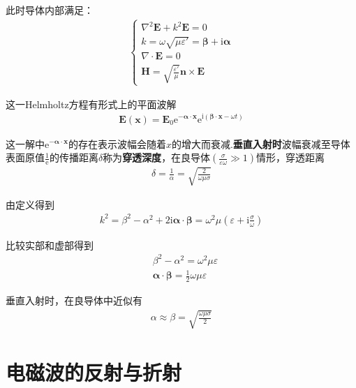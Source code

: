 \documentclass[main.tex]{subfiles}
\begin{document}
此时导体内部满足：
\begin{align}
    \left\{\begin{array}{l}
        \nabla ^2\boldsymbol{E}+k^2 \boldsymbol{E} = 0\\
        k = \omega \sqrt{\mu \varepsilon '} = \boldsymbol{\beta} + \mathrm{i} \boldsymbol{\alpha}\\
        \nabla \cdot \boldsymbol{E} = 0\\
        \boldsymbol{H} = \displaystyle \sqrt{\frac{\varepsilon '}{\mu}}\boldsymbol{n}\times \boldsymbol{E}
    \end{array}\right.
\end{align}

这一Helmholtz方程有形式上的平面波解
\begin{align}
    \boldsymbol{E}(\boldsymbol{x}) = \boldsymbol{E}_0 \mathrm{e}^{-\boldsymbol{\alpha} \cdot \boldsymbol{x}} \mathrm{e}^{\mathrm{i}(\boldsymbol{\beta} \cdot \boldsymbol{x}-\omega t)}
\end{align}

这一解中$\mathrm{e}^{-\boldsymbol{\alpha} \cdot \boldsymbol{x}}$的存在表示波幅会随着$x$的增大而衰减.\textbf{垂直入射时}波幅衰减至导体表面原值$\displaystyle \frac{1}{\mathrm{e}}$的传播距离$\delta $称为\textbf{穿透深度}，在良导体$\left(\frac{\sigma}{\varepsilon \omega}\gg 1 \right)$情形，穿透距离
\begin{align}
    \delta = \frac{1}{\alpha} = \sqrt{\frac{2}{\omega \mu \sigma}}
\end{align}

由定义得到
\begin{align}
    k^2 = \beta ^2 - \alpha ^2 +2 \mathrm{i}\boldsymbol{\alpha} \cdot \boldsymbol{\beta } = \omega ^2 \mu \left(\varepsilon +\mathrm{i} \frac{\sigma}{\omega}\right)
\end{align}

比较实部和虚部得到
\begin{align}
    &\beta ^2 - \alpha ^2 = \omega ^2 \mu \varepsilon\\
    &\boldsymbol{\alpha} \cdot \boldsymbol{\beta } = \frac{1}{2}\omega \mu \varepsilon
\end{align}

垂直入射时，在良导体中近似有
\begin{align}
    \alpha \approx \beta = \sqrt{\frac{\omega \mu \sigma}{2}}
\end{align}


\section{电磁波的反射与折射}
\end{document}
